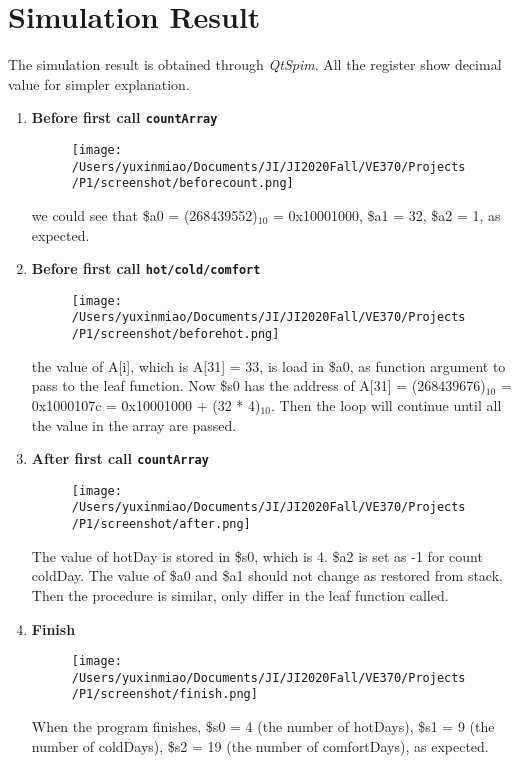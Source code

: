 \documentclass[a4paper]{article}
\begin{document}
	\section{Simulation Result}
	The simulation result is obtained through \textit{QtSpim}. All the register show decimal value for simpler explanation. 
	\begin{enumerate}
	\item \textbf{Before first call \texttt{countArray}}
	
\begin{figure}[!ht]\centering
\texttt{[image: /Users/yuxinmiao/Documents/JI/JI2020Fall/VE370/Projects/P1/screenshot/beforecount.png]}
\label{before}
\end{figure}
we could see that \$a0 = (268439552)$_{10}$ = 0x10001000, \$a1 = 32, \$a2 = 1, as expected. 
\newpage
\item \textbf{Before first call \texttt{hot/cold/comfort}}


 \begin{figure}[!h]\centering
\texttt{[image: /Users/yuxinmiao/Documents/JI/JI2020Fall/VE370/Projects/P1/screenshot/beforehot.png]}
\label{before}
\end{figure}
the value of A[i], which is A[31] = 33, is load in \$a0, as function argument to pass to the leaf function. Now \$s0 has the address of A[31] = (268439676)$_{10}$ = 0x1000107c = 0x10001000 + (32 * 4)$_{10}$. Then the loop will continue until all the value in the array are passed. 

\item \textbf{After first call \texttt{countArray}}


 \begin{figure}[!h]\centering
\texttt{[image: /Users/yuxinmiao/Documents/JI/JI2020Fall/VE370/Projects/P1/screenshot/after.png]}
\label{before}
\end{figure}
The value of hotDay is stored in \$s0, which is 4. \$a2 is set as -1 for count coldDay. The value of \$a0 and \$a1 should not change as restored from stack. Then the procedure is similar, only differ in the leaf function called. 

\item \textbf{Finish}

 \begin{figure}[!h]\centering
\texttt{[image: /Users/yuxinmiao/Documents/JI/JI2020Fall/VE370/Projects/P1/screenshot/finish.png]}
\label{before}
\end{figure}
	When the program finishes, \$s0 = 4 (the number of hotDays), \$s1 = 9 (the number of coldDays), \$s2 = 19 (the number of comfortDays), as expected. 
	
	\end{enumerate}
	
\end{document}
